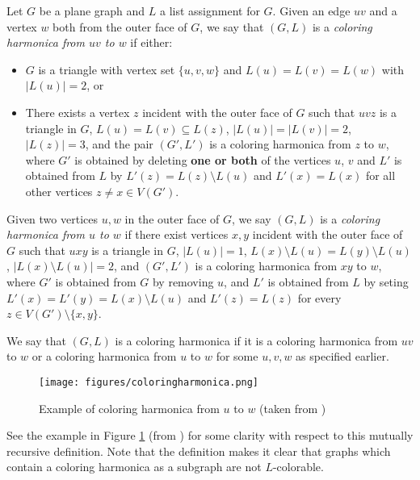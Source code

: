 \begin{definition}
Let $G$ be a plane graph and $L$ a list assignment for $G$. Given an edge $uv$ and a vertex $w$ both from the outer face of $G$, we say that $(G, L)$ is a \emph{coloring harmonica from $uv$ to $w$} if either:

	\begin{itemize}
		\item $G$ is a triangle with vertex set $\{u, v, w\}$ and $L(u) = L(v) = L(w)$ with $|L(u)| = 2$, or
		\item There exists a vertex $z$ incident with the outer face of $G$ such that $uvz$ is a triangle in $G$, $L(u) = L(v) \subseteq L(z)$, $|L(u)| = |L(v)| = 2$, $|L(z)| = 3$, and the pair $(G', L')$ is a coloring harmonica from $z$ to $w$, where $G'$ is obtained by deleting \textbf{one or both} of the vertices $u$, $v$ and $L'$ is obtained from $L$ by $L'(z) = L(z) \setminus L(u)$ and $L'(x) = L(x)$ for all other vertices $z \neq x \in V(G')$.
	\end{itemize}

	Given two vertices $u, w$ in the outer face of $G$, we say $(G, L)$ is a \emph{coloring harmonica from $u$ to $w$} if there exist vertices $x, y$ incident with the outer face of $G$ such that $uxy$ is a triangle in $G$, $|L(u)| = 1$, $L(x) \setminus L(u) = L(y) \setminus L(u)$, $|L(x) \setminus L(u)|=2$, and $(G', L')$ is a coloring harmonica from $xy$ to $w$, where $G'$ is obtained from $G$ by removing $u$, and $L'$ is obtained from $L$ by seting $L'(x) = L'(y) = L(x) \setminus L(u)$ and $L'(z) = L(z)$ for every $z \in V(G') \setminus \{x, y\}$.


We say that $(G, L)$ is a coloring harmonica if it is a coloring harmonica from $uv$ to $w$ or a coloring harmonica from $u$ to $w$ for some $u, v, w$ as specified earlier.
\end{definition}

\begin{figure}[h]
\centering
\texttt{[image: figures/coloringharmonica.png]}
\caption{Example of coloring harmonica from $u$ to $w$ (taken from \cite{fivelistcoloring3})}
\label{fig:harmonica}
\end{figure}

See the example in Figure \ref{fig:harmonica} (from \cite{fivelistcoloring3}) for some clarity with respect to this mutually recursive definition. Note that the definition makes it clear that graphs which contain a coloring harmonica as a subgraph are not $L$-colorable. 

